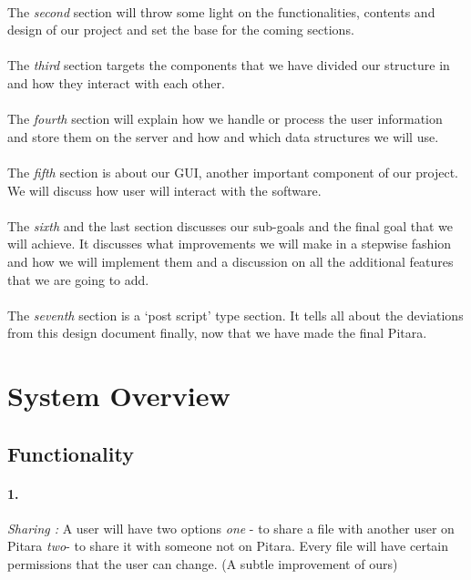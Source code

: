 \documentclass{article}
\begin{document}
\paragraph{}The \emph{second} section will throw some light on the functionalities, contents and design of our project and set the base for the coming sections.
\paragraph{}The \emph{third} section targets the components that we have divided our structure in and how they interact with each other.
\paragraph{}The \emph{fourth} section will explain how we handle or process the user information and store them on the server and how and which data structures we will use.
\paragraph{}The \emph{fifth} section is about our GUI, another important component of our project. We will discuss how user will interact with the software.
\paragraph{}The \emph{sixth} and the last section discusses our sub-goals and the final goal that we will achieve. It discusses what improvements we will make in a stepwise fashion and how we will implement them and a discussion on all the additional features that we are going to add.
\paragraph{}The \emph{seventh} section is a `post script' type section. It tells all about the deviations from this design document finally, now that we have made the final Pitara.

	\section{System Overview}\label{sysover}
	\subsection{Functionality}
	\paragraph{1.} \emph{Sharing :} A user will have two options \emph{one} - to share a file with another user on Pitara \emph{two}- to share it with someone not on Pitara. Every file will have certain permissions that the user can change. (A subtle improvement of ours)
\end{document}
